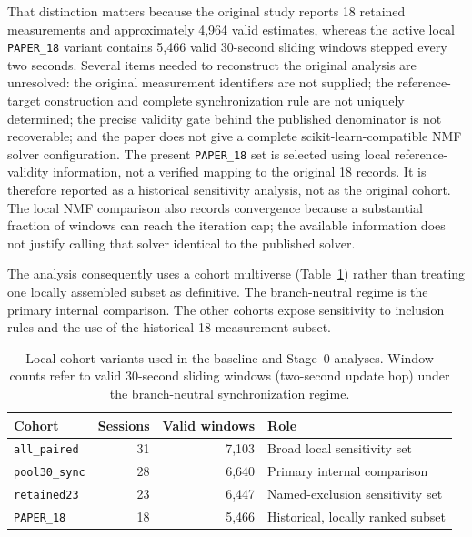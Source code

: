 That distinction matters because the original study reports 18 retained measurements and
approximately 4,964 valid estimates, whereas the active local \texttt{PAPER\_18} variant contains 5,466
valid 30-second sliding windows stepped every two seconds. Several items needed to reconstruct the original analysis are unresolved:
the original measurement identifiers are not supplied; the reference-target construction and
complete synchronization rule are not uniquely determined; the precise validity gate behind the
published denominator is not recoverable; and the paper does not give a complete
scikit-learn-compatible NMF solver configuration. The present \texttt{PAPER\_18} set is selected using
local reference-validity information, not a verified mapping to the original 18 records. It is
therefore reported as a historical sensitivity analysis, not as the original cohort. The local
NMF comparison also records convergence because a substantial fraction of windows can reach the
iteration cap; the available information does not justify calling that solver identical to the
published solver.

The analysis consequently uses a cohort multiverse (Table~\ref{tab:ch3_cohorts}) rather than
treating one locally assembled subset as definitive. The branch-neutral regime is the primary
internal comparison. The other cohorts expose sensitivity to inclusion rules and the use of the
historical 18-measurement subset.

\begin{table}[htbp]
  \centering
  \small
  \caption{Local cohort variants used in the baseline and Stage~0 analyses. Window counts refer
  to valid 30-second sliding windows (two-second update hop) under the branch-neutral synchronization regime.}
  \label{tab:ch3_cohorts}
  \begin{tabular}{@{}lrrl@{}}
    \toprule
    Cohort & Sessions & Valid windows & Role \\
    \midrule
\texttt{all\_paired} & 31 & 7,103 & Broad local sensitivity set \\
\texttt{pool30\_sync} & 28 & 6,640 & Primary internal comparison \\
\texttt{retained23} & 23 & 6,447 & Named-exclusion sensitivity set \\
\texttt{PAPER\_18} & 18 & 5,466 & Historical, locally ranked subset \\
    \bottomrule
  \end{tabular}
\end{table}

